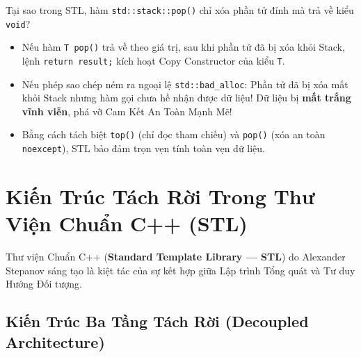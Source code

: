 \documentclass[12pt,a4paper,oneside]{book}
\begin{document}
\begin{underhoodbox}
Tại sao trong STL, hàm \texttt{std::stack::pop()} chỉ xóa phần tử đỉnh mà trả về kiểu \texttt{void}?
\begin{itemize}
    \item Nếu hàm \texttt{T pop()} trả về theo giá trị, sau khi phần tử đã bị xóa khỏi Stack, lệnh \texttt{return result;} kích hoạt Copy Constructor của kiểu \texttt{T}.
    \item Nếu phép sao chép ném ra ngoại lệ \texttt{std::bad\_alloc}: Phần tử đã bị xóa mất khỏi Stack nhưng hàm gọi chưa hề nhận được dữ liệu! Dữ liệu bị \textbf{mất trắng vĩnh viễn}, phá vỡ Cam Kết An Toàn Mạnh Mẽ!
    \item Bằng cách tách biệt \texttt{top()} (chỉ đọc tham chiếu) và \texttt{pop()} (xóa an toàn \texttt{noexcept}), STL bảo đảm trọn vẹn tính toàn vẹn dữ liệu.
\end{itemize}
\end{underhoodbox}

\section{Kiến Trúc Tách Rời Trong Thư Viện Chuẩn C++ (STL)}

Thư viện Chuẩn C++ (\textbf{Standard Template Library --- STL}) do Alexander Stepanov sáng tạo là kiệt tác của sự kết hợp giữa Lập trình Tổng quát và Tư duy Hướng Đối tượng.

\subsection{Kiến Trúc Ba Tầng Tách Rời (Decoupled Architecture)}
\end{document}
